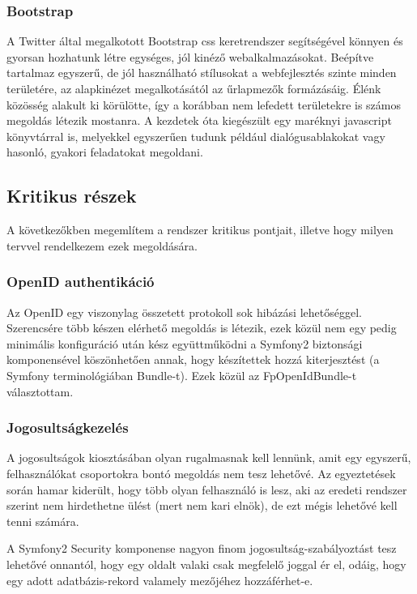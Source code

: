 \documentclass[a4paper,12pt,oneside]{report}
\begin{document}
\subsubsection{Bootstrap}

A Twitter által megalkotott Bootstrap\cite{website:bootstrap} css keretrendszer segítségével könnyen és gyorsan hozhatunk létre egységes, jól kinéző webalkalmazásokat. Beépítve tartalmaz egyszerű, de jól használható stílusokat a webfejlesztés szinte minden területére, az alapkinézet megalkotásától az űrlapmezők formázásáig. Élénk közösség alakult ki körülötte, így a korábban nem lefedett területekre is számos megoldás létezik mostanra. A kezdetek óta kiegészült egy maréknyi javascript könyvtárral is, melyekkel egyszerűen tudunk például dialógusablakokat vagy hasonló, gyakori feladatokat megoldani.

\subsection{Kritikus részek}

A következőkben megemlítem a rendszer kritikus pontjait, illetve hogy milyen tervvel rendelkezem ezek megoldására.

\subsubsection{OpenID authentikáció}

Az OpenID\cite{website:openid_specifikacio} egy viszonylag összetett protokoll sok hibázási lehetőséggel. Szerencsére több készen elérhető megoldás is létezik, ezek közül nem egy pedig minimális konfiguráció után kész együttműködni a Symfony2 biztonsági komponensével köszönhetően annak, hogy készítettek hozzá kiterjesztést (a Symfony terminológiában Bundle-t). Ezek közül az FpOpenIdBundle\cite{website:fpopenidbundle}-t választottam.

\subsubsection{Jogosultságkezelés}

A jogosultságok kiosztásában olyan rugalmasnak kell lennünk, amit egy egyszerű, felhasználókat csoportokra bontó megoldás nem tesz lehetővé. Az egyeztetések során hamar kiderült, hogy több olyan felhasználó is lesz, aki az eredeti rendszer szerint nem hirdethetne ülést (mert nem kari elnök), de ezt mégis lehetővé kell tenni számára.

A Symfony2 Security komponense nagyon finom jogosultság-szabályoztást tesz lehetővé onnantól, hogy egy oldalt valaki csak megfelelő joggal ér el, odáig, hogy egy adott adatbázis-rekord valamely mezőjéhez hozzáférhet-e.
\end{document}
